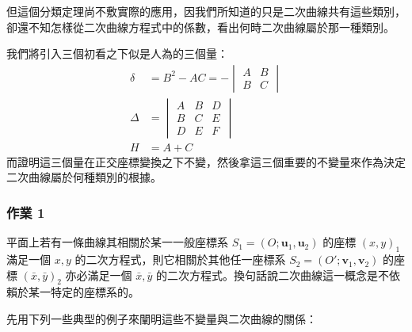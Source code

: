 但這個分類定理尚不敷實際的應用，因我們所知道的只是二次曲線共有這些類別，卻還不知怎樣從二次曲線方程式中的係數，看出何時二次曲線屬於那一種類別。

我們將引入三個初看之下似是人為的三個量：
\begin{equation}
\begin{aligned}
\delta &= B^2 - AC = -\begin{vmatrix} A & B \\ B & C \end{vmatrix} \\[0.5em]
\Delta &= \begin{vmatrix} A & B & D \\ B & C & E \\ D & E & F \end{vmatrix} \\[0.5em]
H &= A + C
\end{aligned}
\label{eq:b4-ch4-invariants-def}
\end{equation}
而證明這三個量在正交座標變換之下不變，然後拿這三個重要的不變量來作為決定二次曲線屬於何種類別的根據。

\subsubsection*{作業 1}
平面上若有一條曲線其相關於某一一般座標系 $S_1 = (O; \mathbf{u}_1, \mathbf{u}_2)$ 的座標 $(x, y)_1$ 滿足一個 $x, y$ 的二次方程式，則它相關於其他任一座標系 $S_2 = (O'; \mathbf{v}_1, \mathbf{v}_2)$ 的座標 $(\bar{x}, \bar{y})_2$ 亦必滿足一個 $\bar{x}, \bar{y}$ 的二次方程式。換句話說二次曲線這一概念是不依賴於某一特定的座標系的。

先用下列一些典型的例子來闡明這些不變量與二次曲線的關係：

